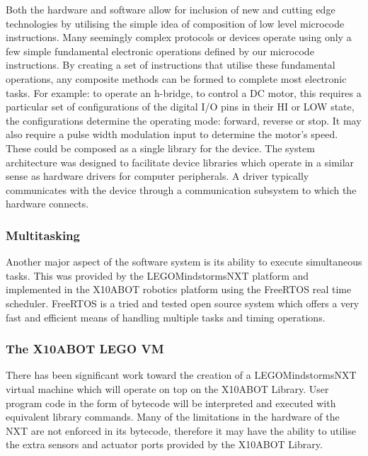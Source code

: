     
	Both the hardware and software allow for inclusion of new and cutting edge technologies by utilising the simple idea of composition of low level microcode instructions. Many seemingly complex protocols or devices operate using only a few simple fundamental electronic operations defined by our microcode instructions. By creating a set of instructions that utilise these fundamental operations, any composite methods can be formed to complete most electronic tasks. For example: to operate an h-bridge, to control a DC motor, this requires a particular set of configurations of the digital I/O pins in their HI or LOW state, the configurations determine the operating mode: forward, reverse or stop. It may also require a pulse width modulation input to determine the motor's speed. These could be composed as a single library for the device. The \xten system architecture was designed to facilitate device libraries which operate in a similar sense as hardware drivers for computer peripherals. A driver typically communicates with the device through a communication subsystem to which the hardware connects.	
	
	\subsubsection{Multitasking} %
	\label{ssub:multitasking}
	
	Another major aspect of the software system is its ability to execute simultaneous tasks. This was provided by the LEGO\textregistered  Mindstorms\textregistered  NXT platform and implemented in the X10ABOT robotics platform using the FreeRTOS real time scheduler. FreeRTOS is a tried and tested open source system which offers a very fast and efficient means of handling multiple tasks and timing operations.
	
	\subsubsection{The X10ABOT LEGO VM} %
	\label{ssub:the_x10abot_lego_vm}
	There has been significant work toward the creation of a LEGO\textregistered  Mindstorms\textregistered  NXT virtual machine which will operate on top on the X10ABOT Library. User program code in the form of bytecode will be interpreted and executed with equivalent library commands. Many of the limitations in the hardware of the NXT are not enforced in its bytecode, therefore it may have the ability to utilise the extra sensors and actuator ports provided by the X10ABOT Library.
	
